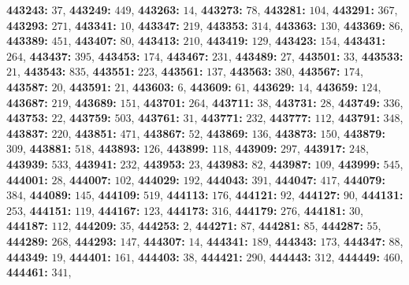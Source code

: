 \textsf{\bfseries 443243:} $37$, \textsf{\bfseries 443249:} $449$, \textsf{\bfseries 443263:} $14$, \textsf{\bfseries 443273:} $78$, \textsf{\bfseries 443281:} $104$, \textsf{\bfseries 443291:} $367$, \textsf{\bfseries 443293:} $271$, \textsf{\bfseries 443341:} $10$, \textsf{\bfseries 443347:} $219$, \textsf{\bfseries 443353:} $314$, \textsf{\bfseries 443363:} $130$, \textsf{\bfseries 443369:} $86$, \textsf{\bfseries 443389:} $451$, \textsf{\bfseries 443407:} $80$, \textsf{\bfseries 443413:} $210$, \textsf{\bfseries 443419:} $129$, \textsf{\bfseries 443423:} $154$, \textsf{\bfseries 443431:} $264$, \textsf{\bfseries 443437:} $395$, \textsf{\bfseries 443453:} $174$, \textsf{\bfseries 443467:} $231$, \textsf{\bfseries 443489:} $27$, \textsf{\bfseries 443501:} $33$, \textsf{\bfseries 443533:} $21$, \textsf{\bfseries 443543:} $835$, \textsf{\bfseries 443551:} $223$, \textsf{\bfseries 443561:} $137$, \textsf{\bfseries 443563:} $380$, \textsf{\bfseries 443567:} $174$, \textsf{\bfseries 443587:} $20$, \textsf{\bfseries 443591:} $21$, \textsf{\bfseries 443603:} $6$, \textsf{\bfseries 443609:} $61$, \textsf{\bfseries 443629:} $14$, \textsf{\bfseries 443659:} $124$, \textsf{\bfseries 443687:} $219$, \textsf{\bfseries 443689:} $151$, \textsf{\bfseries 443701:} $264$, \textsf{\bfseries 443711:} $38$, \textsf{\bfseries 443731:} $28$, \textsf{\bfseries 443749:} $336$, \textsf{\bfseries 443753:} $22$, \textsf{\bfseries 443759:} $503$, \textsf{\bfseries 443761:} $31$, \textsf{\bfseries 443771:} $232$, \textsf{\bfseries 443777:} $112$, \textsf{\bfseries 443791:} $348$, \textsf{\bfseries 443837:} $220$, \textsf{\bfseries 443851:} $471$, \textsf{\bfseries 443867:} $52$, \textsf{\bfseries 443869:} $136$, \textsf{\bfseries 443873:} $150$, \textsf{\bfseries 443879:} $309$, \textsf{\bfseries 443881:} $518$, \textsf{\bfseries 443893:} $126$, \textsf{\bfseries 443899:} $118$, \textsf{\bfseries 443909:} $297$, \textsf{\bfseries 443917:} $248$, \textsf{\bfseries 443939:} $533$, \textsf{\bfseries 443941:} $232$, \textsf{\bfseries 443953:} $23$, \textsf{\bfseries 443983:} $82$, \textsf{\bfseries 443987:} $109$, \textsf{\bfseries 443999:} $545$, \textsf{\bfseries 444001:} $28$, \textsf{\bfseries 444007:} $102$, \textsf{\bfseries 444029:} $192$, \textsf{\bfseries 444043:} $391$, \textsf{\bfseries 444047:} $417$, \textsf{\bfseries 444079:} $384$, \textsf{\bfseries 444089:} $145$, \textsf{\bfseries 444109:} $519$, \textsf{\bfseries 444113:} $176$, \textsf{\bfseries 444121:} $92$, \textsf{\bfseries 444127:} $90$, \textsf{\bfseries 444131:} $253$, \textsf{\bfseries 444151:} $119$, \textsf{\bfseries 444167:} $123$, \textsf{\bfseries 444173:} $316$, \textsf{\bfseries 444179:} $276$, \textsf{\bfseries 444181:} $30$, \textsf{\bfseries 444187:} $112$, \textsf{\bfseries 444209:} $35$, \textsf{\bfseries 444253:} $2$, \textsf{\bfseries 444271:} $87$, \textsf{\bfseries 444281:} $85$, \textsf{\bfseries 444287:} $55$, \textsf{\bfseries 444289:} $268$, \textsf{\bfseries 444293:} $147$, \textsf{\bfseries 444307:} $14$, \textsf{\bfseries 444341:} $189$, \textsf{\bfseries 444343:} $173$, \textsf{\bfseries 444347:} $88$, \textsf{\bfseries 444349:} $19$, \textsf{\bfseries 444401:} $161$, \textsf{\bfseries 444403:} $38$, \textsf{\bfseries 444421:} $290$, \textsf{\bfseries 444443:} $312$, \textsf{\bfseries 444449:} $460$, \textsf{\bfseries 444461:} $341$, 
